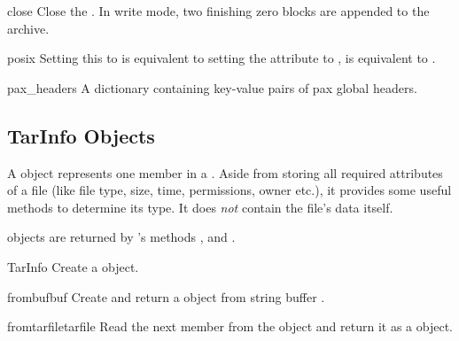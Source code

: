 \begin{methoddesc}{close}{}
    Close the . In write mode, two finishing zero
    blocks are appended to the archive.
\end{methoddesc}

\begin{memberdesc}{posix}
    Setting this to  is equivalent to setting the
     attribute to ,
     is equivalent to .
\end{memberdesc}

\begin{memberdesc}{pax_headers}
    A dictionary containing key-value pairs of pax global headers.
\end{memberdesc}


\subsection{TarInfo Objects \label{tarinfo-objects}}

A  object represents one member in a
. Aside from storing all required attributes of a file
(like file type, size, time, permissions, owner etc.), it provides
some useful methods to determine its type. It does \emph{not} contain
the file's data itself.

 objects are returned by 's methods
,  and .

\begin{classdesc}{TarInfo}{}
    Create a  object.
\end{classdesc}

\begin{methoddesc}{frombuf}{buf}
    Create and return a  object from string buffer .
\end{methoddesc}

\begin{methoddesc}{fromtarfile}{tarfile}
    Read the next member from the  object  and
    return it as a  object.
\end{methoddesc}

